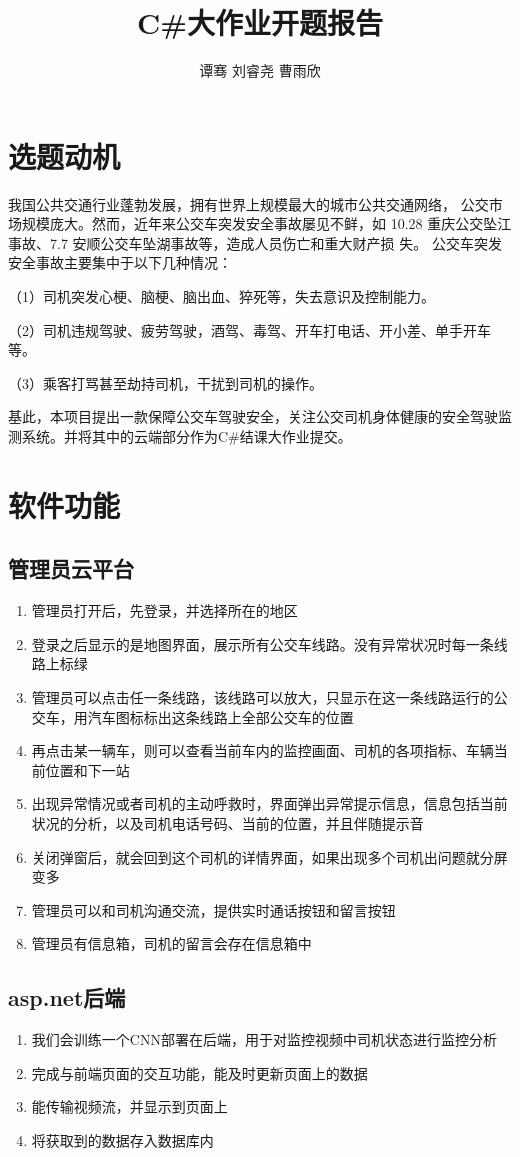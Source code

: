 \documentclass{article}
\title{C\#大作业开题报告}
\author{谭骞 \quad 刘睿尧 \quad 曹雨欣}
\date{}
\begin{document}
\maketitle
\section*{选题动机}
我国公共交通行业蓬勃发展，拥有世界上规模最大的城市公共交通网络， 公交市场规模庞大。然而，近年来公交车突发安全事故屡见不鲜，如 10.28 重庆公交坠江事故、7.7 安顺公交车坠湖事故等，造成人员伤亡和重大财产损 失。 公交车突发安全事故主要集中于以下几种情况： 

（1）司机突发心梗、脑梗、脑出血、猝死等，失去意识及控制能力。 

（2）司机违规驾驶、疲劳驾驶，酒驾、毒驾、开车打电话、开小差、单手开车等。 

（3）乘客打骂甚至劫持司机，干扰到司机的操作。 

基此，本项目提出一款保障公交车驾驶安全，关注公交司机身体健康的安全驾驶监测系统。并将其中的云端部分作为C\#结课大作业提交。
\section*{软件功能}
\subsection*{管理员云平台}
\begin{enumerate}
\item 管理员打开后，先登录，并选择所在的地区
\item 登录之后显示的是地图界面，展示所有公交车线路。没有异常状况时每一条线路上标绿
\item 管理员可以点击任一条线路，该线路可以放大，只显示在这一条线路运行的公交车，用汽车图标标出这条线路上全部公交车的位置
\item 再点击某一辆车，则可以查看当前车内的监控画面、司机的各项指标、车辆当前位置和下一站
\item 出现异常情况或者司机的主动呼救时，界面弹出异常提示信息，信息包括当前状况的分析，以及司机电话号码、当前的位置，并且伴随提示音
\item 关闭弹窗后，就会回到这个司机的详情界面，如果出现多个司机出问题就分屏变多
\item 管理员可以和司机沟通交流，提供实时通话按钮和留言按钮
\item 管理员有信息箱，司机的留言会存在信息箱中
\end{enumerate}
\subsection*{asp.net后端}
\begin{enumerate}
\item 我们会训练一个CNN部署在后端，用于对监控视频中司机状态进行监控分析
\item 完成与前端页面的交互功能，能及时更新页面上的数据
\item 能传输视频流，并显示到页面上
\item 将获取到的数据存入数据库内
\end{enumerate}
\end{document}

